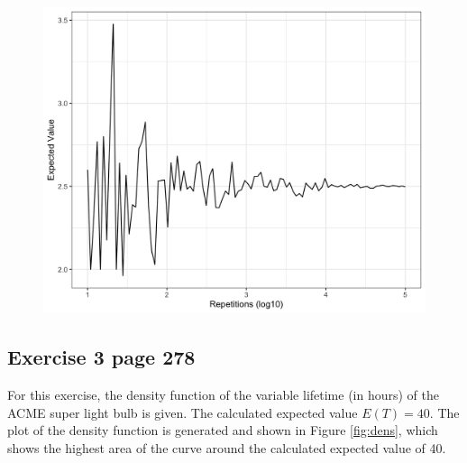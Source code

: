 \documentclass[10pt,leter,openany]{article}
\begin{document}
\begin{figure}
	\begin{center}
		\includegraphics[scale=0.15]{img/plot_MC_18_249}
		\label{fig:plotrepMC}
	\end{center}
\end{figure}

	\subsection{Exercise 3 page 278}

For this exercise, the density function of the variable lifetime (in hours) of the ACME super light bulb is given. The calculated expected value $E(T) = 40$. The plot of the density function is generated and shown in Figure \ref{fig:dens}, which shows the highest area of the curve around the calculated expected value of 40.
\end{document}
